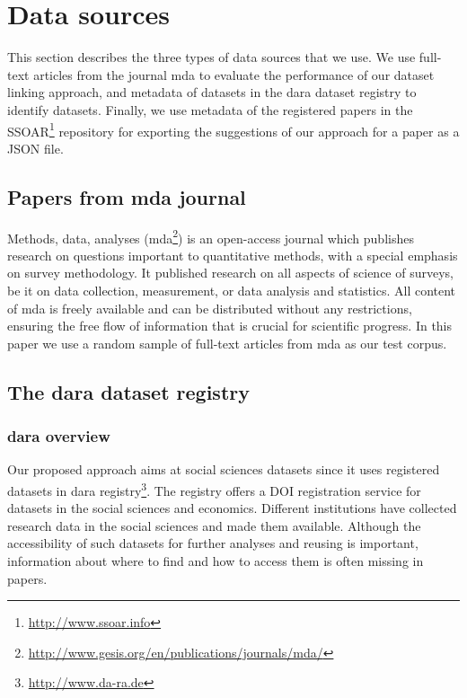 \documentclass{IOS-Book-Article}
\newcommand{\dara}{\textsf{da\textbar ra}}
\begin{document}
\section{Data sources}
\label{sec:data}
This section describes the three types of data sources that we use. We use full-text articles from the journal mda to evaluate the performance of our dataset linking approach, and metadata of datasets in the {\dara} dataset registry to identify datasets. 
Finally, we use metadata of the registered papers in the SSOAR\footnote{\url{http://www.ssoar.info}} repository for exporting the suggestions of our approach for a paper as a JSON file.
 
 \subsection{Papers from mda journal}\label{sec:mda}
 
 Methods, data, analyses (mda\footnote{\url{http://www.gesis.org/en/publications/journals/mda/}}) is an open-access journal which publishes research on questions important to quantitative methods, with a special emphasis on survey methodology. It published research on all aspects of science of surveys, be it on data collection, measurement, or data analysis and statistics. All content of mda is freely available and can be distributed without any restrictions, ensuring the free flow of information that is crucial for scientific progress. In this paper we use a random sample of full-text articles from mda as our test corpus.
  \subsection{The {\dara} dataset registry}
  
  \subsubsection{{\dara} overview}
Our proposed approach aims at social sciences datasets since it uses registered datasets in {\dara} registry\footnote{\url{http://www.da-ra.de}}. The registry offers a DOI registration service for datasets in the social sciences and economics. 
Different institutions have collected research data in the social sciences and made them available. Although the accessibility of such datasets for further analyses and reusing is important, information about where to find and how to access them is often missing in papers.
\end{document}
